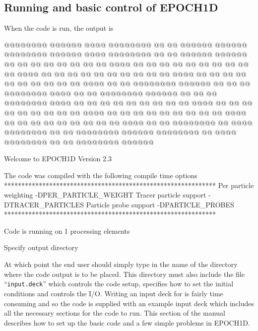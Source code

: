 \documentclass[12pt,a4paper]{article}
\newcommand{\code}[1]{{\texttt{#1}}}
\newcommand{\qtt}[1]{``{\code{#1}}''}
\newcommand{\EPOCH}{{\color{warwickdark}\fontfamily{phv}\selectfont{EPOCH}}}
\newenvironment{lboxverbatim}[1]{
\setlength{\FrameSep}{0pt}
\def\FrameCommand{\fboxsep=0pt \colorbox{shadecolor}}
\MakeFramed{\FrameRestore}
\vspace{-13.5pt}
\fvset{label=#1}
\boxverb
}{
\endboxverb
\vspace{-13.5pt}
\endMakeFramed
}
\begin{document}
\subsection{Running {\EPOCH} and basic control of EPOCH1D}
When the code is run, the output is
\begin{lboxverbatim}{Command line output}
     @@@@@@@@  @@@@@@      @@@@    @@@@@@@@  @@    @@    @@@@@@    @@@@@@
     @@@@@@@@  @@@@@@      @@@@    @@@@@@@@  @@    @@    @@@@@@    @@@@@@
     @@        @@    @@  @@    @@  @@        @@    @@      @@@@    @@  @@
     @@        @@    @@  @@    @@  @@        @@    @@      @@@@    @@  @@
     @@        @@    @@  @@    @@  @@        @@    @@      @@@@    @@    @@
     @@        @@    @@  @@    @@  @@        @@    @@      @@@@    @@    @@
     @@@@@@@@  @@@@@@    @@    @@  @@        @@@@@@@@      @@@@    @@    @@
     @@@@@@@@  @@@@@@    @@    @@  @@        @@@@@@@@      @@@@    @@    @@
     @@        @@        @@    @@  @@        @@    @@      @@@@    @@    @@
     @@        @@        @@    @@  @@        @@    @@      @@@@    @@    @@
     @@        @@        @@    @@  @@        @@    @@      @@@@    @@  @@
     @@        @@        @@    @@  @@        @@    @@      @@@@    @@  @@
     @@@@@@@@  @@          @@@@    @@@@@@@@  @@    @@    @@@@@@@@  @@@@@@
     @@@@@@@@  @@          @@@@    @@@@@@@@  @@    @@    @@@@@@@@  @@@@@@





 Welcome to EPOCH1D Version 2.3

 The code was compiled with the following compile time options
 *************************************************************
 Per particle weighting -DPER_PARTICLE_WEIGHT
 Tracer particle support -DTRACER_PARTICLES
 Particle probe support -DPARTICLE_PROBES
 *************************************************************

 Code is running on 1 processing elements


 Specify output directory
\end{lboxverbatim}

At which point the end user should simply type in the name of the directory
where the code output is to be placed. This directory must also include the
file \qtt{input.deck} which controls the code setup, specifies how to set the
initial conditions and controls the I/O. Writing an input deck for {\EPOCH} is
fairly time consuming and so the code is supplied with an example input deck
which includes all the necessary sections for the code to run. This section of
the manual describes how to set up the basic code and a few simple problems in
EPOCH1D.
\end{document}
